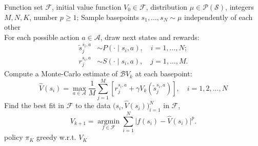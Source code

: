 \documentclass{article}
\numberwithin{equation}{section}
\newcommand{\cA}{\mathcal{A}}
\newcommand{\cB}{\mathcal{B}}
\newcommand{\cF}{\mathcal{F}}
\newcommand{\cP}{\mathcal{P}}
\newcommand{\cS}{\mathcal{S}}
\begin{document}
\begin{algorithm}[ht]
    \centering
    \caption{Fitted Value Iteration}
    \label{alg:fvi}
    \begin{algorithmic}[1]
         Function set $\cF$, initial value function $V_0 \in \cF$, distribution $\mu \in \cP(\cS)$, integers $M,N,K$, number $p\geq 1$;
          \STATE Sample basepoints $s_1, \ldots, s_N \sim \mu$ independently of each other \\
          \STATE For each possible action $a\in \cA$, draw next states and rewards:
            $$
            \begin{aligned}
            \tilde{s}_j^{s_i, a} & \sim P\left(\cdot \mid s_i, a\right),\quad i=1, \ldots, N; \\
            r_j^{s_i, a} & \sim S\left(\cdot \mid s_i, a\right),\quad j=1, \ldots, M.
            \end{aligned}
            $$
          \STATE Compute a Monte-Carlo estimate of $\cB V_k$ at each basepoint:
            $$
            \hat{V}\left(s_i\right)=\max _{a \in \mathcal{A}} \frac{1}{M} \sum_{j=1}^M\left[r_j^{s_i, a}+\gamma V_k\left(\tilde{s}_j^{s_i, a}\right)\right], \quad i=1,2, \ldots, N
            $$
          \STATE Find the best fit in $\mathcal{F}$ to the data $\bigl(s_i, \hat{V}\left(s_i\right)\bigr)_{i=1}^N$ in $\cF$,
            $$
            V_{k+1}=\underset{f \in \mathcal{F}}{\operatorname{argmin}} \sum_{i=1}^N\bigl|f\left(s_i\right)-\hat{V}\left(s_i\right)\bigr|^p .
            $$
        \ENDFOR
         policy $\pi_K$ greedy w.r.t. $V_K$
    \end{algorithmic}
\end{algorithm}
\end{document}
